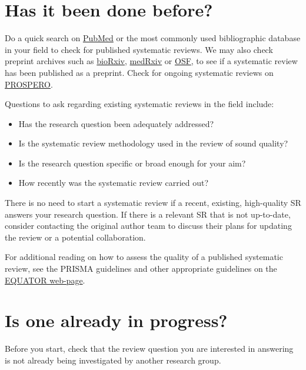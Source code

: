 \documentclass[
]{book}
\providecommand{\tightlist}{%
  \setlength{\itemsep}{0pt}\setlength{\parskip}{0pt}}
\begin{document}
\hypertarget{has-it-been-done-before}{%
\section{Has it been done before?}\label{has-it-been-done-before}}

Do a quick search on \href{https://pubmed.ncbi.nlm.nih.gov/}{PubMed} or the most commonly used bibliographic database in your field to check for published systematic reviews. We may also check preprint archives such as \href{https://www.biorxiv.org/}{bioRxiv}, \href{https://www.medrxiv.org/}{medRxiv} or \href{https://osf.io/}{OSF}, to see if a systematic review has been published as a preprint. Check for ongoing systematic reviews on \href{https://www.crd.york.ac.uk/prospero/}{PROSPERO}.

Questions to ask regarding existing systematic reviews in the field include:

\begin{itemize}
\tightlist
\item
  Has the research question been adequately addressed?
\item
  Is the systematic review methodology used in the review of sound quality?
\item
  Is the research question specific or broad enough for your aim?
\item
  How recently was the systematic review carried out?
\end{itemize}

There is no need to start a systematic review if a recent, existing, high-quality SR answers your research question. If there is a relevant SR that is not up-to-date, consider contacting the original author team to discuss their plans for updating the review or a potential collaboration.

For additional reading on how to assess the quality of a published systematic review, see the PRISMA guidelines and other appropriate guidelines on the \href{https://www.equator-network.org/}{EQUATOR web-page}.

\hypertarget{is-one-already-in-progress}{%
\section{Is one already in progress?}\label{is-one-already-in-progress}}

Before you start, check that the review question you are interested in answering is not already being investigated by another research group.
\end{document}
